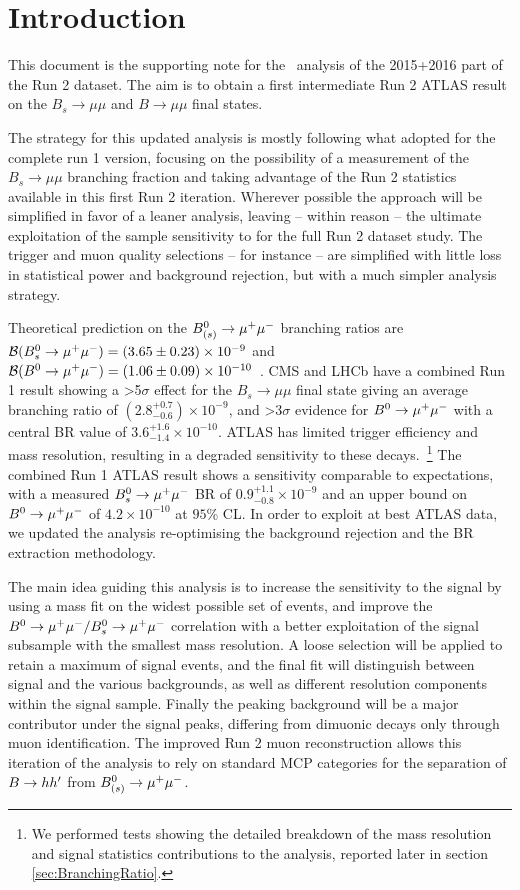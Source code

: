\section{Introduction}
\label{sec:Introduction}

This document is the supporting note for the \Bmumu\ analysis
of the 2015+2016 part of the Run 2 dataset.
The aim is to obtain a first intermediate Run 2 ATLAS result on the $B_{s} \to \mu \mu$ and $B \to \mu \mu$ final states.

The strategy for this updated analysis is mostly following what adopted for the
complete run 1 version, focusing on the possibility of a measurement
of the $B_{s} \to \mu \mu$ branching fraction and taking advantage of the Run 2 statistics
available in this first Run 2 iteration.
Wherever possible the approach will be simplified in favor of a leaner analysis,
leaving -- within reason -- the ultimate exploitation of the sample sensitivity to for the full Run 2 dataset study.
The trigger and muon quality selections -- for instance -- are simplified with little loss in statistical power
and background rejection, but with a much simpler analysis strategy.

Theoretical prediction on the $B_{(s)}^0 \to \mu^+\mu^-$ branching ratios are
${\cal B}(B_s^0 \to \mu^+\mu^-) = (3.65 \pm 0.23) \times 10^{-9}$ and
${\cal B}(B^0 \to \mu^+\mu^-) = (1.06 \pm 0.09) \times 10^{-10}$~\cite{Bobeth:2013uxa}.
CMS and LHCb have a combined Run 1 result \cite{Aaij:2017vad,CMS:2014xfa} showing a >5$\sigma$ effect for the $B_{s} \to \mu \mu$ final state giving
an average branching ratio of $(2.8^{+0.7}_{-0.6}) \times 10^{-9}$,
and >3$\sigma$ evidence for $B^0 \to \mu^+\mu^-$ with a central BR value of $3.6^{+1.6}_{-1.4} \times 10^{-10}$.
ATLAS has limited trigger efficiency and mass resolution, resulting
in a degraded sensitivity to these decays.~\footnote{We performed
  tests showing the detailed breakdown of the mass resolution and signal statistics contributions
  to the analysis, reported later in section \ref{sec:BranchingRatio}.}
The combined Run 1 ATLAS result shows a sensitivity comparable to expectations,
with a measured $B_s^0 \to \mu^+\mu^-$ BR of $0.9^{+1.1}_{-0.8} \times 10^{-9}$ and an upper bound
on $B^0 \to \mu^+\mu^-$ of $4.2 \times 10^{-10}$ at $95\%$ CL.
In order to exploit at best ATLAS data, we updated the analysis re-optimising the background
rejection and the BR extraction methodology.

The main idea guiding this analysis is to increase the sensitivity
to the signal by using a mass fit on the widest possible
set of events, and improve the $B^0 \to \mu^+\mu^-/B_s^0 \to \mu^+\mu^-$ correlation with
a better exploitation of the signal subsample with the smallest mass resolution.
 A loose selection will be applied to retain
a maximum of signal events, and the final fit will distinguish
between signal and the various backgrounds, as well as different resolution components
within the signal sample.
Finally the peaking background will be a major contributor under
the signal peaks, differing from dimuonic decays only through muon identification.
The improved Run 2 muon reconstruction allows this iteration of the analysis to rely
on standard MCP categories for the separation of $B \to hh^\prime$ from $B_{(s)}^0 \to \mu^+\mu^-$.

